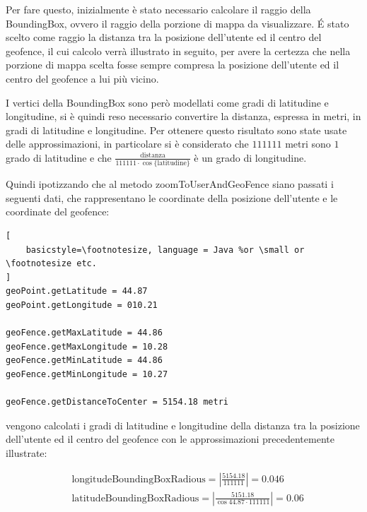 Per fare questo, inizialmente è stato necessario calcolare il raggio della BoundingBox, ovvero il raggio della porzione di mappa da visualizzare. \'E stato scelto come raggio la distanza tra la posizione dell'utente ed il centro del geofence, il cui calcolo verrà illustrato in seguito, per avere la certezza che nella porzione di mappa scelta fosse sempre compresa la posizione dell'utente ed il centro del geofence a lui più vicino.

I vertici della BoundingBox sono però modellati come gradi di latitudine e longitudine, si è quindi reso necessario convertire la distanza, espressa in metri, in gradi di latitudine e longitudine. 
Per ottenere questo risultato sono state usate delle approssimazioni, in particolare si è considerato che $111111$ metri sono $1$ grado di latitudine e che $\frac{\text{distanza}}{ 111111 \cdot \cos{\text{\{latitudine\}}}} $ è un grado di longitudine.

Quindi ipotizzando che al metodo zoomToUserAndGeoFence siano passati i seguenti dati, che rappresentano le coordinate della posizione dell'utente e le coordinate del geofence:

\begin{lstlisting}[
    basicstyle=\footnotesize, language = Java %or \small or \footnotesize etc.
]
geoPoint.getLatitude = 44.87
geoPoint.getLongitude = 010.21

geoFence.getMaxLatitude = 44.86
geoFence.getMaxLongitude = 10.28
geoFence.getMinLatitude = 44.86
geoFence.getMinLongitude = 10.27

geoFence.getDistanceToCenter = 5154.18 metri
\end{lstlisting}

vengono calcolati i gradi di latitudine e longitudine della distanza tra la posizione dell'utente ed il centro del geofence con le approssimazioni precedentemente illustrate:

\[\begin{split}
    &\text{longitudeBoundingBoxRadious} = | \frac{5154.18}{111111} | = 0.046 \\
    &\text{latitudeBoundingBoxRadious} = | \frac{5151.18}{\cos{44.87 \cdot 111111}} | = 0.06
\end{split}\]

